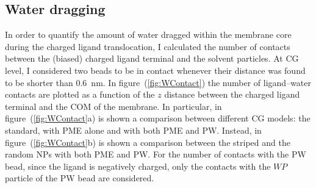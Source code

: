 \subsection{Water dragging}
\label{sec:WDragging}
In order to quantify the amount of water dragged within the membrane core during the charged ligand translocation, I calculated the number of contacts between the (biased) charged ligand terminal and the solvent particles. At \ac{CG} level, I considered two beads to be in contact whenever their distance was found to be shorter than $0.6$~nm. In figure~(\ref{fig:WContact}) the number of ligand--water contacts are plotted as a function of the $z$ distance between the charged ligand terminal and the \ac{COM} of the membrane. In particular, in figure~(\ref{fig:WContact}a) is shown a comparison between different \ac{CG} \martini models: the standard, with \ac{PME} alone and with both \ac{PME} and \ac{PW}. Instead, in figure~(\ref{fig:WContact}b) is shown a comparison between the striped and the random \acp{NP} with both \ac{PME} and \ac{PW}. For the number of contacts with the \ac{PW} bead, since the ligand is negatively charged, only the contacts with the $WP$ particle of the \ac{PW} bead are considered.
